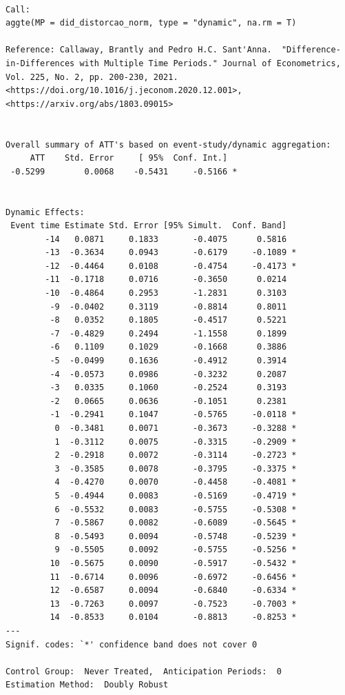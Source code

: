 \documentclass[
  letterpaper,
  DIV=11,
  numbers=noendperiod]{scrartcl}
\begin{document}
\begin{verbatim}

Call:
aggte(MP = did_distorcao_norm, type = "dynamic", na.rm = T)

Reference: Callaway, Brantly and Pedro H.C. Sant'Anna.  "Difference-in-Differences with Multiple Time Periods." Journal of Econometrics, Vol. 225, No. 2, pp. 200-230, 2021. <https://doi.org/10.1016/j.jeconom.2020.12.001>, <https://arxiv.org/abs/1803.09015> 


Overall summary of ATT's based on event-study/dynamic aggregation:  
     ATT    Std. Error     [ 95%  Conf. Int.]  
 -0.5299        0.0068    -0.5431     -0.5166 *


Dynamic Effects:
 Event time Estimate Std. Error [95% Simult.  Conf. Band]  
        -14   0.0871     0.1833       -0.4075      0.5816  
        -13  -0.3634     0.0943       -0.6179     -0.1089 *
        -12  -0.4464     0.0108       -0.4754     -0.4173 *
        -11  -0.1718     0.0716       -0.3650      0.0214  
        -10  -0.4864     0.2953       -1.2831      0.3103  
         -9  -0.0402     0.3119       -0.8814      0.8011  
         -8   0.0352     0.1805       -0.4517      0.5221  
         -7  -0.4829     0.2494       -1.1558      0.1899  
         -6   0.1109     0.1029       -0.1668      0.3886  
         -5  -0.0499     0.1636       -0.4912      0.3914  
         -4  -0.0573     0.0986       -0.3232      0.2087  
         -3   0.0335     0.1060       -0.2524      0.3193  
         -2   0.0665     0.0636       -0.1051      0.2381  
         -1  -0.2941     0.1047       -0.5765     -0.0118 *
          0  -0.3481     0.0071       -0.3673     -0.3288 *
          1  -0.3112     0.0075       -0.3315     -0.2909 *
          2  -0.2918     0.0072       -0.3114     -0.2723 *
          3  -0.3585     0.0078       -0.3795     -0.3375 *
          4  -0.4270     0.0070       -0.4458     -0.4081 *
          5  -0.4944     0.0083       -0.5169     -0.4719 *
          6  -0.5532     0.0083       -0.5755     -0.5308 *
          7  -0.5867     0.0082       -0.6089     -0.5645 *
          8  -0.5493     0.0094       -0.5748     -0.5239 *
          9  -0.5505     0.0092       -0.5755     -0.5256 *
         10  -0.5675     0.0090       -0.5917     -0.5432 *
         11  -0.6714     0.0096       -0.6972     -0.6456 *
         12  -0.6587     0.0094       -0.6840     -0.6334 *
         13  -0.7263     0.0097       -0.7523     -0.7003 *
         14  -0.8533     0.0104       -0.8813     -0.8253 *
---
Signif. codes: `*' confidence band does not cover 0

Control Group:  Never Treated,  Anticipation Periods:  0
Estimation Method:  Doubly Robust
\end{verbatim}
\end{document}
